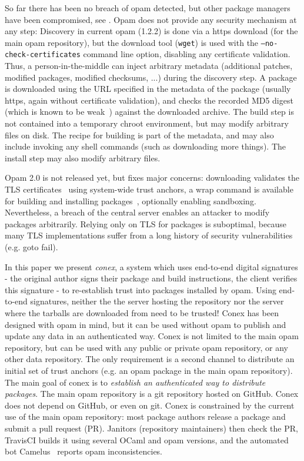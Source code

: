 \documentclass[nocopyrightspace]{sigplanconf}
\begin{document}
So far there has been no breach of opam detected, but other package managers have been compromised, see \cite{cabal,maven,npm,rubygems}.
Opam does not provide any security mechanism at any step:
Discovery in current opam (1.2.2) is done via a https download (for the main opam repository), but the download tool (\texttt{wget}) is used with the \texttt{--no-check-certificates} command line option, disabling any certificate validation.
Thus, a person-in-the-middle can inject arbitrary metadata (additional patches, modified packages, modified checksums, ...) during the discovery step.
A package is downloaded using the URL specified in the metadata of the package (usually https, again without certificate validation), and checks the recorded MD5 digest (which is known to be weak~\cite{rfc6151}) against the downloaded archive.
The build step is not contained into a temporary chroot environment, but may modify arbitrary files on disk.
The recipe for building is part of the metadata, and may also include invoking any shell commands (such as downloading more things).
The install step may also modify arbitrary files.

Opam 2.0 is not released yet, but fixes major concerns:
downloading validates the TLS certificates~\cite{opampr} using system-wide trust anchors,
a wrap command is available for building and installing packages~\cite{wrappr}, optionally enabling sandboxing.
Nevertheless, a breach of the central server enables an attacker to modify packages arbitrarily.
Relying only on TLS for packages is suboptimal, because many TLS implementations suffer from a long history of security vulnerabilities (e.g. goto fail).

In this paper we present \emph{conex}, a system which uses end-to-end digital signatures - the original author signs their package and build instructions, the client verifies this signature - to re-establish trust into packages installed by opam.
Using end-to-end signatures, neither the the server hosting the repository nor the server where the tarballs are downloaded from need to be trusted!
Conex has been designed with opam in mind, but it can be used without opam to publish and update any data in an authenticated way.
Conex is not limited to the main opam repository, but can be used with any public or private opam repository, or any other data repository.
The only requirement is a second channel to distribute an initial set of trust anchors (e.g. an opam package in the main opam repository).
The main goal of conex is to \emph{establish an authenticated way to distribute packages}.
The main opam repository is a git repository hosted on GitHub.
Conex does not depend on GitHub, or even on git.
Conex is constrained by the current use of the main opam repository:  most package authors release a package and submit a pull request (PR).
Janitors (repository maintainers) then check the PR, TravisCI builds it using several OCaml and opam versions, and the automated bot Camelus~\cite{camelus} reports opam inconsistencies.
\end{document}
